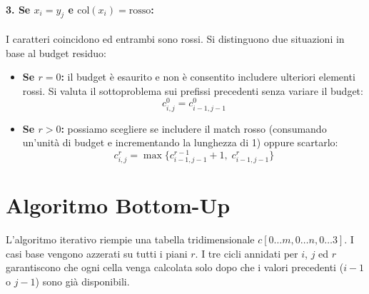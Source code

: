\paragraph{3. Se $x_i = y_j$ e $\text{col}(x_i) = \text{rosso}$:}
I caratteri coincidono ed entrambi sono rossi. Si distinguono due situazioni in base al budget residuo:
\begin{itemize}
    \item \textbf{Se $r = 0$:} il budget è esaurito e non è consentito includere ulteriori elementi rossi. Si valuta il sottoproblema sui prefissi precedenti senza variare il budget:
    \begin{equation}
        c_{i,j}^0 = c_{i-1, j-1}^0
    \end{equation}
    \item \textbf{Se $r > 0$:} possiamo scegliere se includere il match rosso (consumando un'unità di budget e incrementando la lunghezza di 1) oppure scartarlo:
    \begin{equation}
        c_{i,j}^r = \max\{c_{i-1, j-1}^{r-1} + 1, \; c_{i-1, j-1}^r\}
    \end{equation}
\end{itemize}

\newpage
\section{Algoritmo Bottom-Up}

L'algoritmo iterativo riempie una tabella tridimensionale $c[0 \dots m, 0 \dots n, 0 \dots 3]$. I casi base vengono azzerati su tutti i piani $r$. I tre cicli annidati per $i$, $j$ ed $r$ garantiscono che ogni cella venga calcolata solo dopo che i valori precedenti ($i-1$ o $j-1$) sono già disponibili.

